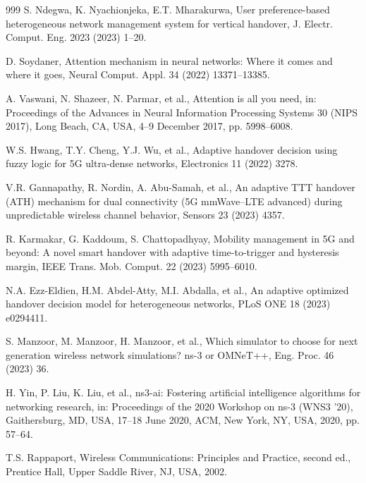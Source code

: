 \documentclass[preprint,12pt]{elsarticle}
\begin{document}
\begin{thebibliography}{999}
S. Ndegwa, K. Nyachionjeka, E.T. Mharakurwa, User preference-based heterogeneous network management system for vertical handover, J. Electr. Comput. Eng. 2023 (2023) 1--20.

D. Soydaner, Attention mechanism in neural networks: Where it comes and where it goes, Neural Comput. Appl. 34 (2022) 13371--13385.

A. Vaswani, N. Shazeer, N. Parmar, et al., Attention is all you need, in: Proceedings of the Advances in Neural Information Processing Systems 30 (NIPS 2017), Long Beach, CA, USA, 4--9 December 2017, pp. 5998--6008.

W.S. Hwang, T.Y. Cheng, Y.J. Wu, et al., Adaptive handover decision using fuzzy logic for 5G ultra-dense networks, Electronics 11 (2022) 3278.

V.R. Gannapathy, R. Nordin, A. Abu-Samah, et al., An adaptive TTT handover (ATH) mechanism for dual connectivity (5G mmWave--LTE advanced) during unpredictable wireless channel behavior, Sensors 23 (2023) 4357.

R. Karmakar, G. Kaddoum, S. Chattopadhyay, Mobility management in 5G and beyond: A novel smart handover with adaptive time-to-trigger and hysteresis margin, IEEE Trans. Mob. Comput. 22 (2023) 5995--6010.

N.A. Ezz-Eldien, H.M. Abdel-Atty, M.I. Abdalla, et al., An adaptive optimized handover decision model for heterogeneous networks, PLoS ONE 18 (2023) e0294411.

S. Manzoor, M. Manzoor, H. Manzoor, et al., Which simulator to choose for next generation wireless network simulations? ns-3 or OMNeT++, Eng. Proc. 46 (2023) 36.

H. Yin, P. Liu, K. Liu, et al., ns3-ai: Fostering artificial intelligence algorithms for networking research, in: Proceedings of the 2020 Workshop on ns-3 (WNS3 '20), Gaithersburg, MD, USA, 17--18 June 2020, ACM, New York, NY, USA, 2020, pp. 57--64.

T.S. Rappaport, Wireless Communications: Principles and Practice, second ed., Prentice Hall, Upper Saddle River, NJ, USA, 2002.
\end{thebibliography}
\end{document}

